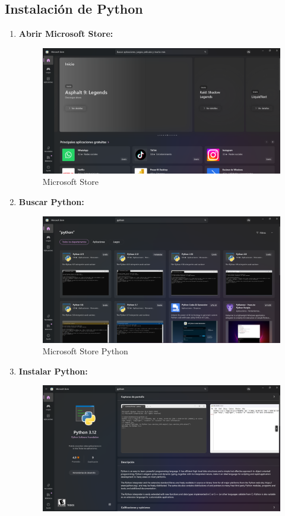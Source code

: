 \documentclass{article}
\begin{document}
  \subsection{Instalación de Python}
  \begin{enumerate}
    \item \textbf{Abrir Microsoft Store:}
    \begin{figure}[H]
      \centering
      \includegraphics[width=1\textwidth, keepaspectratio]{img/store.png}
      \caption{Microsoft Store}
    \end{figure}
    \item \textbf{Buscar Python:}
    \begin{figure}[H]
      \centering
      \includegraphics[width=1\textwidth, keepaspectratio]{img/storePython.png}
      \caption{Microsoft Store Python}
    \end{figure}
    \newpage
    \item \textbf{Instalar Python:}
    \begin{figure}[H]
      \centering
      \includegraphics[width=1\textwidth, keepaspectratio]{img/installPython.png}

\end{figure}
\end{enumerate}
\end{document}
